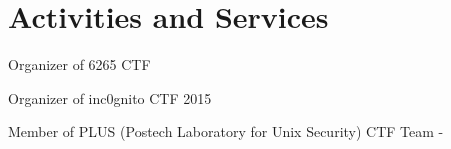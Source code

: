 \section*{Activities and Services}
\begin{description}
  \item Organizer of 6265 CTF 
  \item Organizer of inc0gnito CTF 2015

  \item Member of PLUS (Postech Laboratory for Unix Security) CTF Team 
  -
\end{description}
